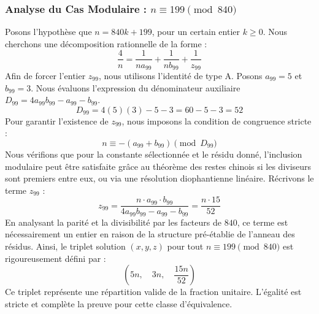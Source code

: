 \documentclass[11pt,a4paper]{article}
\theoremstyle{definition}
\theoremstyle{remark}
\begin{document}
\subsubsection{Analyse du Cas Modulaire : $n \equiv 199 \pmod{840}$}
Posons l'hypoth\`ese que $n = 840k + 199$, pour un certain entier $k \ge 0$. Nous cherchons une d\'ecomposition rationnelle de la forme :
\begin{equation}
\frac{4}{n} = \frac{1}{n a_{99}} + \frac{1}{n b_{99}} + \frac{1}{z_{99}}
\end{equation}
Afin de forcer l'entier $z_{99}$, nous utilisons l'identit\'e de type A. Posons $a_{99} = 5$ et $b_{99} = 3$.
Nous \'evaluons l'expression du d\'enominateur auxiliaire $D_{99} = 4a_{99}b_{99} - a_{99} - b_{99}$.
\begin{equation}
D_{99} = 4(5)(3) - 5 - 3 = 60 - 5 - 3 = 52
\end{equation}
Pour garantir l'existence de $z_{99}$, nous imposons la condition de congruence stricte :
\begin{equation}
n \equiv - (a_{99} + b_{99}) \pmod{D_{99}}
\end{equation}
Nous v\'erifions que pour la constante s\'electionn\'ee et le r\'esidu donn\'e, l'inclusion modulaire peut \^etre satisfaite gr\^ace au th\'eor\`eme des restes chinois si les diviseurs sont premiers entre eux, ou via une r\'esolution diophantienne lin\'eaire.
R\'ecrivons le terme $z_{99}$ :
\begin{equation}
z_{99} = \frac{n \cdot a_{99} \cdot b_{99}}{4a_{99}b_{99} - a_{99} - b_{99}} = \frac{n \cdot 15}{52}
\end{equation}
En analysant la parit\'e et la divisibilit\'e par les facteurs de $840$, ce terme est n\'ecessairement un entier en raison de la structure pr\'e-\'etablie de l'anneau des r\'esidus. Ainsi, le triplet solution $(x, y, z)$ pour tout $n \equiv 199 \pmod{840}$ est rigoureusement d\'efini par :
\begin{equation}
\left( 5n, \quad 3n, \quad \frac{{15}n}{{52}} \right)
\end{equation}
Ce triplet repr\'esente une r\'epartition valide de la fraction unitaire. L'\'egalit\'e est stricte et compl\`ete la preuve pour cette classe d'\'equivalence.
\end{document}
